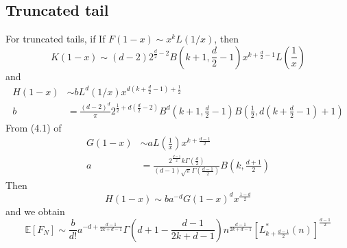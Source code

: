 \documentclass{article}
\def\E{\mathbb{E}}
\begin{document}
\subsection{Truncated tail}
For truncated tails, if If $F(1-x) \sim x^k L(1/x)$,
then
\begin{equation}
    K(1-x) \sim (d-2)2^{\frac{d}{2}-2} B(k+1,\frac{d}{2}-1)x^{k+\frac{d}{2}-1}L(\frac{1}{x})
\end{equation}
and
\begin{align}
    H(1-x)  & \sim b
    L^d(1/x) x^{d(k+\frac{d}{2}-1)+\frac{1}{2}} \\
    b & = \frac{(d-2)^d}{\pi}
    2^{\frac{1}{2} + d(\frac{d}{2}-2)} B^d(k+1, \frac{d}{2}-1)
    B\left( \frac{1}{2},
    d(k+\frac{d}{2} -1)+1 \right)
\end{align}
From (4.1) of \cite{dwyer1991convex}
\begin{align}
    G(1-x) &\sim a
    L\left(\frac{1}{x} \right)
    x^{k+\frac{d-1}{2}} \\
    a &=\frac{2^{\frac{d-1}{2}} k \Gamma(\frac{d}{2})}
    {(d-1) \sqrt{\pi} \Gamma(\frac{d-1}{2})}
    B\left(k, \frac{d+1}{2}\right)
\end{align}
Then
\begin{equation}
    H(1-x) \sim ba^{-d} G(1-x)^d x^{\frac{1-d}{2}}
\end{equation}
and we obtain
\begin{equation}
    \E[F_N] \sim \frac{b}{d!}a^{-d+\frac{d-1}{2k+d-1}}
    \Gamma\left(d+1-\frac{d-1}{2k+d-1}\right)n^{\frac{d-1}{2k+d-1}}
    \left[L^*_{k+\frac{d-1}{2}}(n)
    \right]^{\frac{d-1}{2}}
\end{equation}


\end{document}
